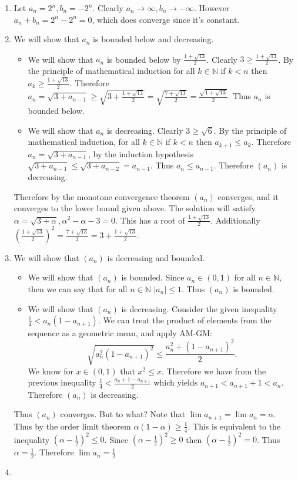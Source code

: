 \documentclass[12pt, letterpaper]{article}
\newcommand{\N}{\mathbb{N}}
\begin{document}
\begin{enumerate}
	\item Let $a_n = 2^n, b_n = -2^n$.  Clearly $a_n \to \infty, b_n \to -\infty$.
	However $a_n + b_n = 2^n - 2^n = 0$, which does converge since it's constant.
	\item We will show that $a_n$ is bounded below and decreasing.
	\begin{itemize}
		\item We will show that $a_n$ is bounded below by $\frac{1 + \sqrt{13}}{2}$.  Clearly $3 \geq \frac{1 + \sqrt{13}}{2}$.  By the principle of mathematical induction for all $k \in \N$ if $k < n$ then $a_k \geq \frac{1+\sqrt{13}}{2}$.
		Therefore $a_{n} = \sqrt{3 + a_{n-1}} \geq \sqrt{3 + \frac{1+\sqrt{13}}{2}} = \sqrt{\frac{7+\sqrt{13}}{2}} = \frac{\sqrt{1+\sqrt{13}}}{2}$.  Thus $a_n$ is bounded below.  
		\item We will show that $a_n$ is decreasing.  Clearly $3 \geq \sqrt{6}$.  
		By the principle of mathematical induction, for all $k \in \N$ if $k < n$ then $a_{k+1} \leq a_k$.  Therefore $a_n = \sqrt{3 + a_{n-1}}$, by the induction 
		hypothesis $\sqrt{3 + a_{n-1}} \leq \sqrt{3 + a_{n-2}} = a_{n-1}$.  
		Thus $a_n \leq a_{n-1}$.  Therefore $(a_n)$ is decreasing.
	\end{itemize}
	Therefore by the monotone convergence theorem $(a_n)$ converges, and it converges to the lower bound given above.  The solution will satisfy 
	$\alpha = \sqrt{3 + \alpha}, \alpha^2 - \alpha - 3 =0$.  This has a root of $\frac{1+ \sqrt{13}}{2}$.  Additionally $\left(\frac{1+\sqrt{13}}{2}\right)^2 = \frac{7+\sqrt{13}}{2} = 3 + \frac{1+\sqrt{13}}{2}$.  
	\item We will show that $(a_n)$ is decreasing and bounded.
	\begin{itemize}
		\item We will show that $(a_n)$ is bounded.  Since $a_n \in (0,1)$ for all $n \in \N$, then we can say that for all $n \in \N$ $|a_n| \leq 1$.  
		Thus $(a_n)$ is bounded.
		\item We will show that $(a_n)$ is decreasing.  Consider the given inequality $\frac{1}{4} < a_n(1-a_{n+1})$.  We can treat the product of 
		elements from the sequence as a geometric mean, and apply AM-GM:
		$$
		\sqrt{a_n^2 (1-a_{n+1})^2} \leq \frac{a_n^2 + (1-a_{n+1})^2}{2}.
		$$ 
		We know for $x \in (0,1)$ that $x^2 \leq x$.  Therefore 
		we have from the previous inequality $\frac{1}{4} < \frac{a_n + 1 - a_{n+1}}{2}$ which yields $a_{n+1} < a_{n+1} + 1 < a_n$.  Therefore $(a_n)$ is decreasing.
	\end{itemize}
	Thus $(a_n)$ converges.  But to what?  Note that $\lim a_{n+1} = \lim a_n = \alpha$.  Thus by the order limit theorem $\alpha(1-\alpha) \geq \frac{1}{4}$.  This is equivalent to the inequality $(\alpha - \frac{1}{2})^2 \leq 0$.  Since $(\alpha - \frac{1}{2})^2 \geq 0$ then $(\alpha - \frac{1}{2})^2 = 0$.  Thus $\alpha = \frac{1}{2}$.  Therefore $\lim a_n = \frac{1}{2}$
	\item 
\end{enumerate}
\end{document}

